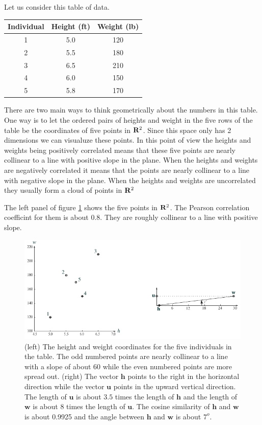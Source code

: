    Let us consider this table of data.
\begin{center}
\begin{tabular}{ccc}
\textbf{Individual} & \textbf{Height (ft)} & \textbf{Weight (lb)} \\
\hline
1 & 5.0 & 120 \\
2 & 5.5 & 180 \\
3 & 6.5 & 210 \\
4 & 6.0 & 150 \\
5 & 5.8 & 170 \\
\end{tabular}
\end{center}
There are two main ways to think geometrically about the numbers in this table.
One way is to let the ordered pairs of heights and weight in the five rows of 
the table be the coordinates of five points in ${\bf R}^2$.  Since this space 
only has 2 dimensions we can visualuze these points.  In this point of view 
the heights and weights being positively correlated means that these five 
points are nearly collinear to a line with positive slope in the plane.  When 
the heights and weights are negatively correlated it means that the points are 
nearly collinear to a line with negative slope in the plane.  When the heights 
and weights are uncorrelated they usually form a cloud of points in ${\bf R}^2$ 
\label{twogeoms}

   The left panel of figure \ref{twogeoms} shows the five points in ${\bf R}^2$.
The Pearson correlation coefficint for them is about $0.8$.  They are roughly 
collinear to a line with positive slope.

\begin{figure}[h]
\centering
\includegraphics[scale=1.25]{./images/heightWeight.pdf}
\caption{(left) The height and weight coordinates for the five individuals in
the table.  The odd numbered points are nearly collinear to a line with a
slope of about $60$ while the even numbered points are more spread out.
(right)  The vector $\mathbf{h}$ points to the right in the horizontal 
direction while the vector $\mathbf{u}$ points in the upward vertical 
direction.  The length of $\mathbf{u}$ is about $3.5$ times the length of 
$\mathbf{h}$ and the length of $\mathbf{w}$ is about $8$ times the length of
$\mathbf{u}$.  The cosine similarity of $\mathbf{h}$ and $\mathbf{w}$ is about 
0.9925 and the angle between $\mathbf{h}$ and $\mathbf{w}$ is about $7^o$.} 
\label{twogeoms}
\end{figure}

